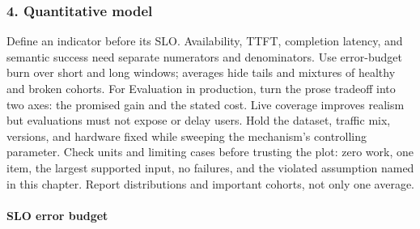 \subsubsection*{4. Quantitative model}
Define an indicator before its SLO. Availability, TTFT, completion latency, and semantic success need separate numerators and denominators. Use error-budget burn over short and long windows; averages hide tails and mixtures of healthy and broken cohorts.
For Evaluation in production, turn the prose tradeoff into two axes: the promised gain and the stated cost. Live coverage improves realism but evaluations must not expose or delay users. Hold the dataset, traffic mix, versions, and hardware fixed while sweeping the mechanism's controlling parameter.
Check units and limiting cases before trusting the plot: zero work, one item, the largest supported input, no failures, and the violated assumption named in this chapter. Report distributions and important cohorts, not only one average.
\paragraph{SLO error budget}
